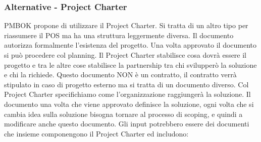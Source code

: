 \subsubsection{Alternative - Project Charter}
PMBOK propone di utilizzare il Project Charter. Si tratta di un altro tipo per riassumere il POS ma ha una struttura leggermente diversa. Il documento autorizza formalmente l'esistenza del progetto. Una volta approvato il documento si può procedere col planning.
Il Project Charter stabilisce cosa dovrà essere il progetto e tra le altre cose stabilisce la partnership tra chi svilupperò la soluzione e chi la richiede.
Questo documento NON è un contratto, il contratto verrà stipulato in caso di progetto esterno ma si tratta di un documento diverso. Col Project Charter specifichiamo come l'organizzazione raggiungerà la soluzione. Il documento una volta che viene approvato definisce la soluzione, ogni volta che si cambia idea sulla soluzione bisogna tornare al processo di scoping, e quindi a modificare anche questo documento.
Gli input potrebbero essere dei documenti che insieme componengono il Project Charter ed includono:
